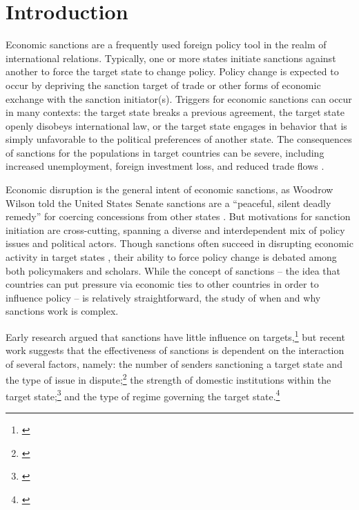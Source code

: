 \section*{Introduction}
\label{intro}

Economic sanctions are a frequently used foreign policy tool in the realm of international relations. Typically, one or more states initiate sanctions against another to force the target state to change policy. Policy change is expected to occur by depriving the sanction target of trade or other forms of economic exchange with the sanction initiator(s). Triggers for economic sanctions can occur in many contexts: the target state breaks a previous agreement, the target state openly disobeys international law, or the target state engages in behavior that is simply unfavorable to the political preferences of another state. The consequences of sanctions for the populations in target countries can be severe, including increased unemployment, foreign investment loss, and reduced trade flows \citep{hufbauer2003impact,hufbauer1997us}. 

Economic disruption is the general intent of economic sanctions, as Woodrow Wilson told the United States Senate sanctions are a ``peaceful, silent deadly remedy'' for coercing concessions from other states \citep{foley23}. But motivations for sanction initiation are cross-cutting, spanning a diverse and interdependent mix of policy issues and political actors. Though sanctions often succeed in disrupting economic activity in target states \citep{escriba2010dealing}, their ability to force policy change is debated among both policymakers and scholars.  While the concept of sanctions -- the idea that countries can put pressure via economic ties to other countries in order to influence policy -- is relatively straightforward, the study of when and why sanctions work is complex.

Early research argued that sanctions have little influence on targets,\footnote{\cite{lam1990, dashti1997, morgan1997, drezner1998}} but recent work suggests that the effectiveness of sanctions is dependent on the interaction of several factors, namely: the number of senders sanctioning a target state and the type of issue in dispute;\footnote{\cite{miers2002, morgan2009threat}} the strength of domestic institutions within the target state;\footnote{\cite{dashti1997,marinov2005}} and the type of regime governing the target state.\footnote{\cite{mcgillivray2004,lektzian2007,allen2008domestic}} 

